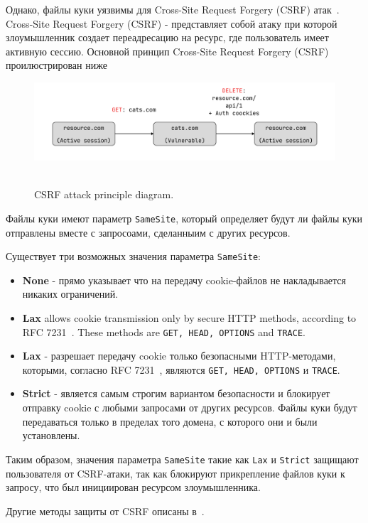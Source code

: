 Однако, файлы куки уязвимы для Cross-Site Request Forgery (CSRF) атак~\cite{siddiqui2011cross}.
Cross-Site Request Forgery (CSRF) - представляет собой атаку при которой злоумышленник создает переадресацию
на ресурс, где пользователь имеет активную сессию.
Основной принцип Cross-Site Request Forgery (CSRF) проилюстрирован ниже

\begin{figure}[H]
    \centering
    \includegraphics[width=1\textwidth]{img/Csrf_diagram}
    ~\caption{CSRF attack principle diagram.}\label{fig:csrf_diagram}
\end{figure}

Файлы куки имеют параметр \texttt{SameSite}, который определяет будут ли файлы куки отправлены вместе с запросоами,
сделанныим с других ресурсов.

Существует три возможных значения параметра \texttt{SameSite}:

\begin{itemize}
    \item \textbf{None} - прямо указывает что на передачу cookie-файлов не накладывается никаких ограничений.
    \item \textbf{Lax} allows cookie transmission only by secure HTTP methods, according to RFC 7231~\cite{fielding2014rfc}.
    These methods are \texttt{GET, HEAD, OPTIONS} and \texttt{TRACE}.
    \item \textbf{Lax} - разрешает передачу cookie только безопасными HTTP-методами, которыми, согласно RFC 7231~\cite{fielding2014rfc},
    являются \texttt{GET, HEAD, OPTIONS} и \texttt{TRACE}.
    \item \textbf{Strict} - является самым строгим вариантом безопасности и блокирует отправку cookie с любыми запросами от других
    ресурсов.
    Файлы куки будут передаваться только в пределах того домена, с которого они и были установлены.
\end{itemize}

Таким образом, значения параметра \texttt{SameSite} такие как \texttt{Lax} и \texttt{Strict} защищают пользователя от CSRF-атаки,
так как блокируют прикрепление файлов куки к запросу, что был инициирован ресурсом злоумышленника.

Другие методы защиты от CSRF описаны в~\cite{owaspCsrf}.